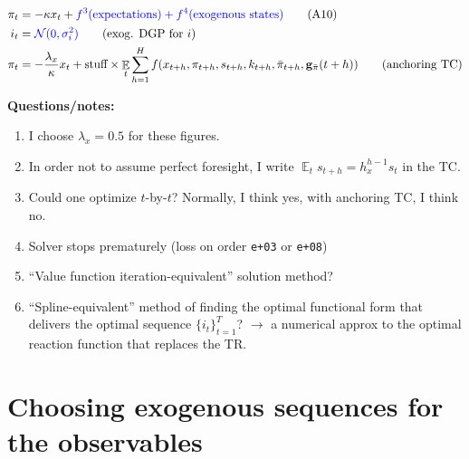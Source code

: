 \documentclass[11pt]{article}
\renewcommand{\[}{\begin{equation}}
\renewcommand{\]}{\end{equation}}
\DeclareMathOperator{\E}{\mathbb{E}}
\begin{document}
\begin{enumerate}
\begin{itemize}
\begin{align}
\pi_t & = -\kappa x_t + \textcolor{blue}{f^3(\text{expectations}) + f^4(\text{exogenous states})} \tag{A10} \\
i_t & = \textcolor{blue}{\mathcal{N}(0,\sigma_i^2)} \tag{exog. DGP for $i$} \\
\pi_t & = -\frac{\lambda_x}{\kappa}x_t +\text{stuff}\times \E_t \sum_{h=1}^{H}f(x_{t+h}, \pi_{t+h}, s_{t+h}, k_{t+h}, \bar{\pi}_{t+h}, \mathbf{g}_{\bar{\pi}}(t+h) ) \tag{anchoring TC}
\end{align}
\end{itemize}
\end{enumerate}

\textbf{Questions/notes:}
\begin{enumerate}
\item I choose $\lambda_x = 0.5$ for these figures.
\item In order not to assume perfect foresight, I write $\E_t s_{t+h} = h_x^{h-1}s_t$ in the TC.
\item Could one optimize $t$-by-$t$? Normally, I think yes, with anchoring TC, I think no.
\item Solver stops prematurely (loss on order \texttt{e+03} or \texttt{e+08})
\item ``Value function iteration-equivalent'' solution method?
\item ``Spline-equivalent'' method of finding the optimal functional form that delivers the optimal sequence $\{i_t\}_{t=1}^T$? $\rightarrow$ a numerical approx to the optimal reaction function that replaces the TR.
\end{enumerate}



\newpage
\section{Choosing exogenous sequences for the observables}

\vspace{-0.2cm}
\end{document}
